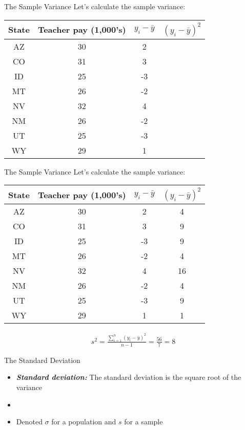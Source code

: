 \documentclass[xcolor=dvipsnames]{beamer}
\begin{document}
\begin{frame}{The Sample Variance}
 Let's calculate the sample variance:
		\begin{center}
			\begin{tabular}{|c|c|c|c|}
				\hline 
				\textbf{State} & \textbf{Teacher pay (1,000's)} &  $y_i-\bar{y}$ & $(y_i-\bar{y})^2$\\ 
				\hline \hline
				AZ & 30 & 2 &\\ \hline 
				CO &  31 & 3 &\\ \hline 
				ID & 25  & -3 &\\  \hline 
				MT &  26 & -2 &\\ \hline 
				NV & 32 & 4 &\\ \hline 
				NM &  26 & -2 &\\ \hline 
				UT &  25 & -3 &\\ \hline 
				WY &  29 & 1 &\\ \hline 
			\end{tabular} 
		\end{center}
\end{frame}

\begin{frame}{The Sample Variance}
	Let's calculate the sample variance:
	\begin{center}
		\begin{tabular}{|c|c|c|c|}
			\hline 
			\textbf{State} & \textbf{Teacher pay (1,000's)} &  $y_i-\bar{y}$ & $(y_i-\bar{y})^2$\\ 
			\hline \hline
			AZ & 30 & 2 & 4\\ \hline 
			CO &  31 & 3 & 9\\ \hline 
			ID & 25  & -3 & 9\\  \hline 
			MT &  26 & -2 & 4\\ \hline 
			NV & 32 & 4 & 16\\ \hline 
			NM &  26 & -2 & 4\\ \hline 
			UT &  25 & -3 & 9\\ \hline 
			WY &  29 & 1 & 1\\ \hline 
		\end{tabular} 
	\end{center}
	\begin{gather*}
	s^2 = \frac{\sum_{i=1}^n (y_i - \bar{y})^2}{n-1} = \frac{56}{7} = 8
	\end{gather*}
\end{frame}


\begin{frame}{The Standard Deviation}
	\begin{itemize}
		\item \textbf{\emph{Standard deviation:}} The standard deviation is the square root of the variance \pause
		\item[]
		\item Denoted $\sigma$ for a population and $s$ for a sample
	\end{itemize}
\end{frame}
\end{document}
